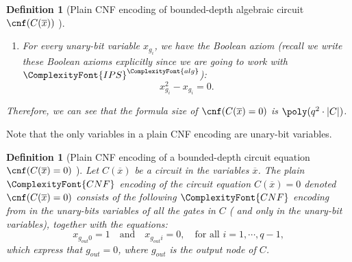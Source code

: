 \documentclass[11pt,letter]{article}
\newtheorem{definition}[theorem]{Definition}
\theoremstyle{remark} %
\newcommand{\alg}{\ComplexityFont{alg}}
\newcommand{\IPS}{%
    {
        \ComplexityFont{IPS} 
    }
}
\newcommand{\CNF}{ %
    {
        \ComplexityFont{CNF}
    }
}
\begin{document}
{\begin{definition}[Plain CNF encoding of bounded-depth algebraic circuit $\cnf(C(\overline{x}))$ \cite{ST25}]
\begin{enumerate}
                \begin{align*}
                     &u_1 \circ u_2 = v_1^g \\
                    &u_{i+2} \circ v_{i}^g = v_{i+1}^g, \qquad 1 \leq i \leq t-3 \\
                    &u_{t} \circ v_{t-2}^g = g.
                \end{align*}
                In other words, we add the \emph{extension variables} $v_i^g$ for each $+,\times$ gate, to sequentially compute the unbounded fan-in gate $g$ into a sequence of binary operations in the obvious way. 
                For simplicity, we denote each equation above by $x \circ y =z$. Then, for each $x\circ y=z$ we have a $\CNF$ $\phi$ in the unary-bits variables of $x, y,z$ that is satisfied by assignment precisely when the output unary-bits of $z$ get their correct values based on the (constant-size) truth table of $\circ$ over $\mathbb{F}_q$ and the input unary-bits of $x,y$ (we ensure that if more than one unary-bit is assigned $1$ in any of the unary-bits of  $x,y,z$ then the $\CNF$ is unsatisfiable). 
            \item For every unary-bit variable $x_{g_i}$, we have the Boolean axiom (recall we write these Boolean axioms explicitly since we are going to work with $\IPS^\alg$):
            \begin{equation*}
                x_{g_i}^2 - x_{g_i} = 0.
            \end{equation*}
        \end{enumerate}
        Therefore, we can see that the formula size of $\cnf(C(\overline{x})=0)$ is $\poly(q^2 \cdot |C|)$.
    \end{definition}

    Note that the only variables in a plain CNF encoding are unary-bit variables.
    
    \begin{definition}[Plain CNF encoding of a bounded-depth circuit equation $\cnf(C(\overline{x})=0)$ \cite{ST25}]
        \label{def: plain CNF encoding of a constant-depth circuit equation cnf(C(x)=0)}
         Let $C(\overline{x})$ be a circuit in the variables $\overline{x}$. The plain $\CNF$ encoding of the circuit equation $C(\overline{x})=0$ denoted $\cnf(C(\overline{x})=0)$ consists of the following $\CNF$ encoding from  in the unary-bits variables of all the gates in $C$ ( and only in the unary-bit variables), together with the equations:
         \begin{equation*}
                x_{g_{out}0} =1 \quad \text{and} \quad x_{g_{out}i} = 0, \quad \text{for all }i=1,\cdots,q-1,
            \end{equation*}
            which express that $g_{out} = 0$, where $g_{out}$ is the output node of $C$.
        

\end{definition}}
\end{document}
